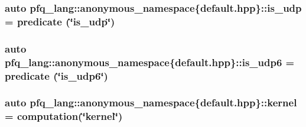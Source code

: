 \hypertarget{namespacepfq__lang_1_1anonymous__namespace_02default_8hpp_03_a120b37089690955fc25203beb98f0fe7}{
\subsubsection[{is\-\_\-udp}]{\setlength{\rightskip}{0pt plus 5cm}auto pfq\-\_\-lang\-::anonymous\-\_\-namespace\{default.\-hpp\}\-::is\-\_\-udp = {\bf predicate} (\char`\"{}is\-\_\-udp\char`\"{})}}\label{namespacepfq__lang_1_1anonymous__namespace_02default_8hpp_03_a120b37089690955fc25203beb98f0fe7}
\hypertarget{namespacepfq__lang_1_1anonymous__namespace_02default_8hpp_03_a31e93829d19f72f4aece81f57d7cef9c}{
\subsubsection[{is\-\_\-udp6}]{\setlength{\rightskip}{0pt plus 5cm}auto pfq\-\_\-lang\-::anonymous\-\_\-namespace\{default.\-hpp\}\-::is\-\_\-udp6 = {\bf predicate} (\char`\"{}is\-\_\-udp6\char`\"{})}}\label{namespacepfq__lang_1_1anonymous__namespace_02default_8hpp_03_a31e93829d19f72f4aece81f57d7cef9c}
\hypertarget{namespacepfq__lang_1_1anonymous__namespace_02default_8hpp_03_a68a2502f951a2b671a7d0496609f5d2a}{
\subsubsection[{kernel}]{\setlength{\rightskip}{0pt plus 5cm}auto pfq\-\_\-lang\-::anonymous\-\_\-namespace\{default.\-hpp\}\-::kernel = {\bf computation}(\char`\"{}kernel\char`\"{})}}\label{namespacepfq__lang_1_1anonymous__namespace_02default_8hpp_03_a68a2502f951a2b671a7d0496609f5d2a}
